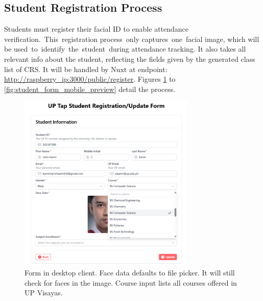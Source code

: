 \subsection{Student Registration Process}
Students must register their facial ID to enable attendance verification. This registration process only captures one facial image, which will be used to identify the student during attendance tracking. It also takes all relevant info about the student, reflecting the fields given by the generated class list of CRS. It will be handled by Nuxt at endpoint: \url{http://raspberry_ip:3000/public/register}. Figures \ref{fig:student_form_pc} to \ref{fig:student_form_mobile_preview} detail the process.
\begin{figure}[h] %
	\centering
	\includegraphics[width=0.75\textwidth]{figures/chapter4/student_form_pc.png} %
	\caption{Form in desktop client. Face data defaults to file picker. It will still check for faces in the image. Course input lists all courses offered in UP Visayas.}
	\label{fig:student_form_pc}
\end{figure}
\clearpage

